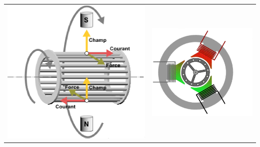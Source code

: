 \documentclass{article}
\begin{document}
\begin{tabular}{cc}
   \includegraphics[scale=0.28]{asynchrone.png} &
   \includegraphics[scale=0.4]{asynchrone2.png} \\
\end{tabular}


\medskip
\end{document}
